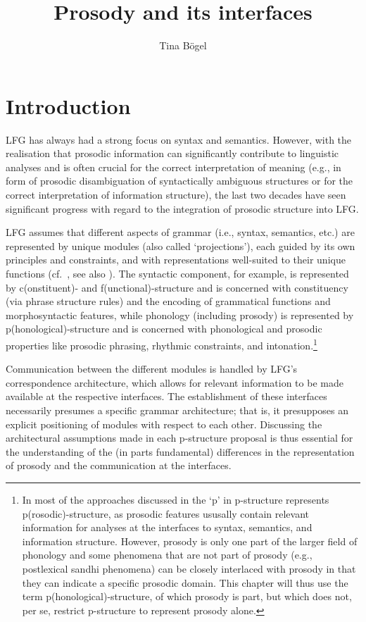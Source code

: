 \documentclass[output=paper,hidelinks]{langscibook}
\title{Prosody and its interfaces}
\author{Tina Bögel\affiliation{University of Konstanz}}
\begin{document}
\maketitle
\label{chap:Prosody}

\section{Introduction}

LFG has always had a strong focus on syntax and semantics. However, with the realisation that prosodic information can significantly contribute to linguistic analyses and is often crucial for the correct interpretation of meaning (e.g., in form of prosodic disambiguation of syntactically ambiguous structures or for the correct interpretation of information structure), the last two decades have seen significant progress with regard to the integration of prosodic structure into LFG. 

LFG assumes that different aspects of grammar (i.e., syntax, semantics, etc.) are represented by unique modules (also called `projections'), each guided by its own principles and constraints, and with representations well-suited to their unique functions  (cf.~\citealt{dalrymple01, Sadock91}, see also ).
The syntactic component, for example, is represented by c(onstituent)- and f(unctional)-structure and is concerned with constituency (via phrase structure rules) and the encoding of grammatical functions and morphosyntactic features, while phonology (including prosody) is represented by p(honological)-structure and is concerned with phonological and prosodic properties like pro\-sod\-ic phrasing, rhythmic constraints, and intonation.\footnote{In most of the approaches discussed in  the `p' in p-structure represents p(rosodic)-structure, as prosodic features ususally contain relevant information for analyses at the interfaces  to syntax, semantics, and information structure. However, prosody is only one part of the larger field of phonology and some phenomena that are not part of prosody (e.g., postlexical sandhi phenomena) can be closely interlaced with prosody in that they can indicate a specific prosodic domain. This chapter will thus use the term p(honological)-structure, of which prosody is part, but which does not, per se, restrict p-structure to represent prosody alone. }

Communication between the different modules is handled by LFG's correspondence architecture, which allows for relevant information to be made available at the respective interfaces. The establishment of these interfaces necessarily presumes a specific grammar architecture; that is, it presupposes an explicit positioning of modules with respect to each other. 
Discussing the architectural assumptions made in each p-structure proposal is thus essential for the understanding of the (in parts fundamental) differences in the representation of prosody and the communication at the interfaces.
 
\end{document}
